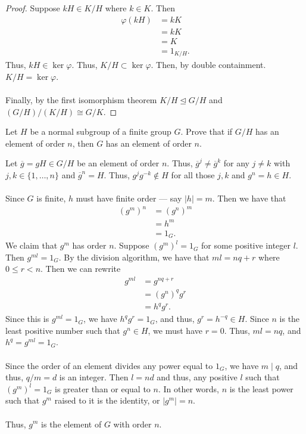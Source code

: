 \documentclass[12 pt, letterpaper]{hmcpset}
\begin{document}
\begin{proof}
		Suppose $kH \in K/H$ where $k \in K$. Then
		\[
			\begin{split}
				\varphi(kH) & = kK \\
					    & = kK \\
					    & = K \\
					    & = 1_{K/H}.
			\end{split}
		\]
		Thus, $kH \in \ker \varphi$. Thus, $K/H \subset \ker \varphi$. Then, by double containment. $K/H = \ker \varphi$. \\\\
		Finally, by the first isomorphism theorem $K/H \trianglelefteq G/H$ and $(G/H)/(K/H) \cong G/K$.
	\end{proof}

\pagebreak

\begin{problem}[4.]
	Let $H$ be a normal subgroup of a finite group $G$. Prove that if $G/H$ has an element of order $n$, then $G$ has an element of order $n$.
\end{problem}

\begin{solution}
	Let $\overline{g} = gH \in G/H$ be an element of order $n$. Thus, $\overline{g}^{j} \neq \overline{g}^{k}$ for any $j \neq k$ with $j, k \in \{ 1, \dots, n \}$ and $\overline{g}^{n} = H$. Thus, $g^{j} g^{-k} \notin H$ for all those $j, k$ and $g^{n} = h \in H$. \\\\
	Since $G$ is finite, $h$ must have finite order --- say $\lvert h  \rvert = m$. Then we have that
	\[
		\begin{split}
			(g^{m})^{n} & = (g^{n})^{m} \\
				    & = h^{m} \\
				    & = 1_{G}.
		\end{split}
	\]
	We claim that $g^{m}$ has order $n$. Suppose $(g^{m})^{l} = 1_{G}$ for some positive integer $l$. Then $g^{ml} = 1_{G}$. By the division algorithm, we have that $ml = nq + r$ where $0 \le r < n$. Then we can rewrite
	\[
		\begin{split}
			g^{ml} & = g^{nq + r} \\
			       & = (g^{n})^{q} g^{r} \\
			       & = h^{q} g^{r}.
		\end{split} 
	\]
	Since this is $g^{ml} = 1_{G}$, we have $h^{q} g^{r} = 1_{G}$, and thus, $g^{r} = h^{-q} \in H$. Since $n$ is the least positive number such that $g^{n} \in H$, we must have $r = 0$. Thus, $ml = nq$, and $h^{q} = g^{ml} = 1_{G}$. \\\\
	Since the order of an element divides any power equal to $1_{G}$, we have $m \mid q$, and thus, $q/m = d$ is an integer. Then $l = nd$ and thus, any positive $l$ such that $(g^{m})^{l} = 1_{G}$ is greater than or equal to $n$. In other words, $n$ is the least power such that $g^{m}$ raised to it is the identity, or $\lvert g^{m} \rvert = n$. \\\\
	Thus, $g^{m}$ is the element of $G$ with order $n$.
\end{solution}
\end{document}
